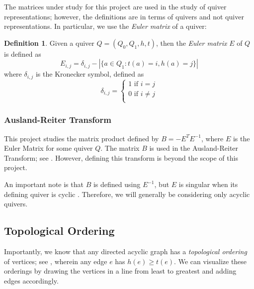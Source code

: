 \documentclass{amsart}
\theoremstyle{theorem}
\theoremstyle{theorem*}
\theoremstyle{definition}
\newtheorem{definition}{Definition}
\begin{document}
The matrices under study for this project are used in the study of quiver
representations; however, the definitions are in terms of quivers and not
quiver representations. In particular, we use the \textit{Euler matrix}
of a quiver:

\begin{definition} \cite{dw} Given a quiver $Q = (Q_0, Q_1, h, t)$, then the
    \textit{Euler matrix} $E$ of $Q$ is defined as
    $$E_{i,j} = \delta_{i,j} - |\{a \in Q_1 : t(a) = i, h(a) = j \}|$$
    where $\delta_{i,j}$ is the Kronecker symbol, defined as
    $$\delta_{i,j} = \begin{cases} 1 \text{ if } i = j \\ 0 \text{ if } i \neq j
            \\\end{cases}$$
\end{definition}

\subsubsection{Ausland-Reiter Transform}

This project studies the matrix product defined by $B = -E^T E^{-1}$, where $E$
is the Euler Matrix for some quiver $Q$. The matrix $B$ is used in the
Ausland-Reiter Transform; see \cite{dw}. However, defining this transform is
beyond the scope of this project.

An important note is that $B$ is defined using $E^{-1}$, but $E$ is
singular when its defining quiver is cyclic
\cite{dp}. Therefore, we will
generally be considering only acyclic quivers.

\subsection{Topological Ordering}

Importantly, we know that any directed acyclic graph has a
\textit{topological ordering} of vertices; see \cite{sw},
wherein any edge $e$ has $h(e) \geq t(e)$. We can visualize these orderings
by drawing the vertices in a line from least to greatest and adding edges
accordingly.
\end{document}
